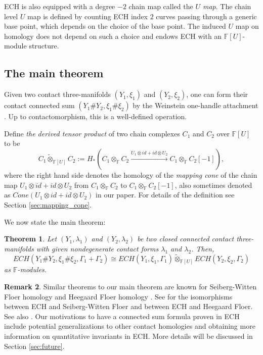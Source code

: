 \documentclass{article}
\numberwithin{equation}{section}
\newtheorem{theorem}{Theorem}[section]
\theoremstyle{definition}
\newtheorem{remark}[theorem]{Remark}
\newcommand{\F}{\mathbb{F}}
\begin{document}
ECH is also equipped with a degree $-2$ chain map called the \emph{$U$ map}. The chain level $U$ map is defined by counting ECH index $2$ curves passing through a generic base point, which depends on the choice of the base point. The induced $U$ map on homology does not depend on such a choice and endows ECH with an $\F[U]$-module structure. 


\subsection{The main theorem}
Given two contact three-manifolds $(Y_1, \xi_1)$ and $(Y_2, \xi_2)$, one can form their contact connected sum $(Y_1 \# Y_2, \xi_1 \# \xi_2)$ by the Weinstein one-handle attachment \cite{Weinstein_one_handle}. Up to contactomorphism, this is a well-defined operation.

Define \emph{the derived tensor product} of two chain complexes $C_1$ and $C_2$ over $\F[U]$ to be 
$$C_1 \tilde\otimes_{\F[U]} C_2:= H_*(C_1 \otimes_{\F} C_2 \xrightarrow{U_1 \otimes id + id \otimes U_2} C_1 \otimes_{\F} C_2[-1]),$$
where the right hand side denotes the homology of the \emph{mapping cone} of the chain map $U_1 \otimes id + id \otimes U_2$ from $C_1 \otimes_{\F} C_2$ to $C_1 \otimes_{\F} C_2[-1]$, also sometimes denoted as $Cone(U_1 \otimes id + id \otimes U_2)$ in our paper. For details of the definition see Section \ref{sec:mapping_cone}.

We now state the main theorem:

\begin{theorem}
\label{thm:main}
Let $(Y_1, \lambda_1)$ and $(Y_2, \lambda_2)$ be two closed connected contact three-manifolds with given nondegenerate contact forms $\lambda_1$ and $\lambda_2$. Then,
\begin{equation}
\label{eq:derived_tensor_product}
    ECH(Y_1 \# Y_2, \xi_1\#\xi_2, \Gamma_1+\Gamma_2) \cong ECH(Y_1,\xi_1, \Gamma_1) \tilde\otimes_{\F[U]} ECH(Y_2,\xi_2, \Gamma_2)
\end{equation}
as $\F$-modules.
\end{theorem}
\begin{remark}
    Similar theorems to our main theorem are known for Seiberg-Witten Floer homology \cite{BMO, HM_HF_5, Lin_connected_sum} and Heegaard Floer homology \cite{OSz, OSz_connected_sum_formula}. See \cite{Taubes_isomorphism_I,Taubes_isomorphism_II, Taubes_isomorphism_III, Taubes_isomorphism_IV, Taubes_isomorphism_V, HF_ECH, ECH_HF_1, ECH_HF_2, ECH_HF_3} for the isomorphisms between ECH and Seiberg-Witten Floer and between ECH and Heegaard Floer. See also \cite{HM_HF_1, HM_HF_2, HM_HF_3, HM_HF_4, HM_HF_5}. Our motivations to have a connected sum formula proven in ECH include potential generalizations to other contact homologies and obtaining more information on quantitative invariants in ECH. More details will be discussed in Section \ref{sec:future}.
\end{remark}
\end{document}
